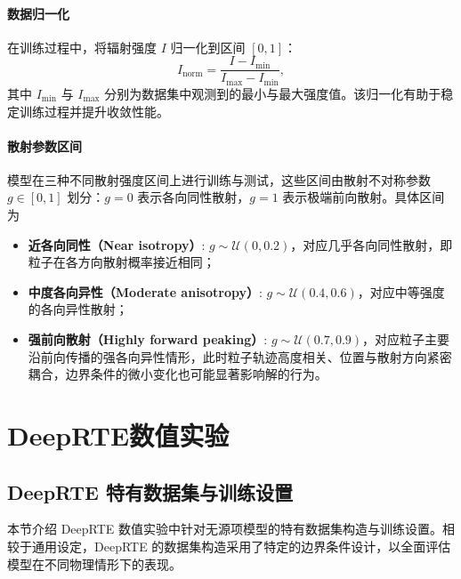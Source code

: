 \paragraph{数据归一化}
在训练过程中，将辐射强度 $I$ 归一化到区间 $[0, 1]$：
\begin{equation}
    I_{\text{norm}} = \frac{I - I_{\text{min}}}{I_{\text{max}} - I_{\text{min}}},
\end{equation}
其中 $I_{\text{min}}$ 与 $I_{\text{max}}$ 分别为数据集中观测到的最小与最大强度值。该归一化有助于稳定训练过程并提升收敛性能。

\paragraph{散射参数区间}
模型在三种不同散射强度区间上进行训练与测试，这些区间由散射不对称参数 $g\in[0,1]$ 划分：$g=0$ 表示各向同性散射，$g=1$ 表示极端前向散射。具体区间为
\begin{itemize}
    \item \textbf{近各向同性（Near isotropy）}: $ g \sim \mathcal{U}(0, 0.2)$，对应几乎各向同性散射，即粒子在各方向散射概率接近相同；
    \item \textbf{中度各向异性（Moderate anisotropy）}: $ g \sim \mathcal{U}(0.4, 0.6)$，对应中等强度的各向异性散射；
    \item \textbf{强前向散射（Highly forward peaking）}: $ g \sim \mathcal{U}(0.7, 0.9)$，对应粒子主要沿前向传播的强各向异性情形，此时粒子轨迹高度相关、位置与散射方向紧密耦合，边界条件的微小变化也可能显著影响解的行为。
\end{itemize}

\section{DeepRTE数值实验}

\subsection {DeepRTE 特有数据集与训练设置}

本节介绍 DeepRTE 数值实验中针对无源项模型的特有数据集构造与训练设置。相较于通用设定，DeepRTE 的数据集构造采用了特定的边界条件设计，以全面评估模型在不同物理情形下的表现。

